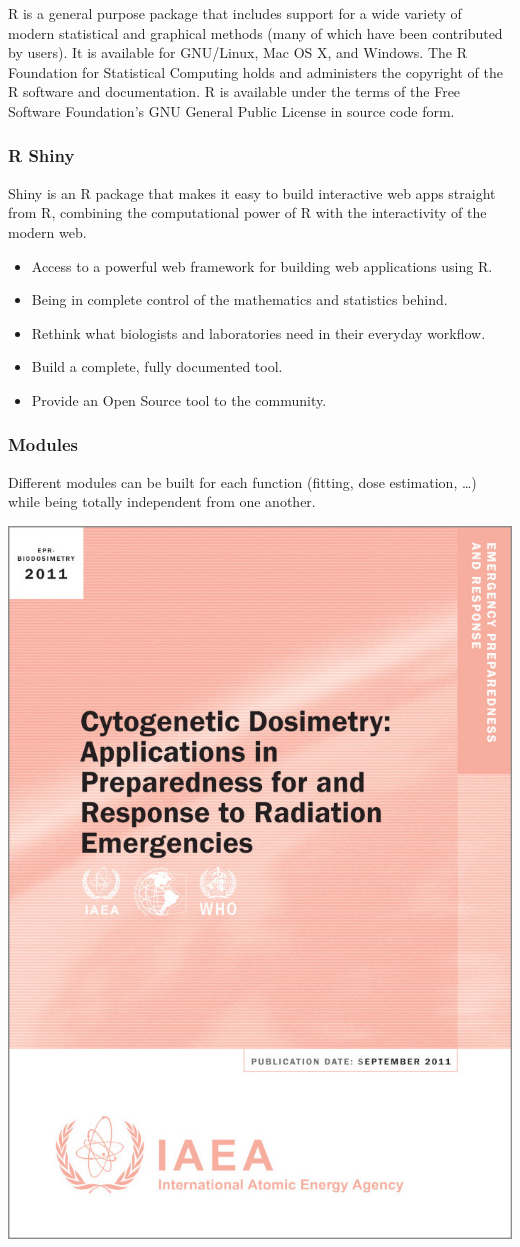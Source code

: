 \documentclass[]{scrartcl}
\begin{document}
R is a general purpose package that includes support for a wide variety of modern
statistical and graphical methods (many of which have been contributed by users). It is available for GNU/Linux, Mac OS X, and Windows. The R Foundation for Statistical Computing holds and administers the copyright of the R software and documentation. R is available under the terms of the Free Software Foundation's GNU General Public License in source code form.

\hypertarget{r-shiny-1}{%
\subsubsection{R Shiny}\label{r-shiny-1}}

Shiny is an R package that makes it easy to build interactive web apps straight from R, combining the computational power of R with the interactivity of the modern web.

\begin{itemize}
\item
  Access to a powerful web framework for building web applications using R.
\item
  Being in complete control of the mathematics and statistics behind.
\item
  Rethink what biologists and laboratories need in their everyday workflow.
\item
  Build a complete, fully documented tool.
\item
  Provide an Open Source tool to the community.
\end{itemize}

\hypertarget{intro-background-modules}{%
\subsubsection{Modules}\label{intro-background-modules}}

Different modules can be built for each function (fitting, dose estimation, \ldots) while being totally independent from one another.

\begin{center}\includegraphics[width=0.35\linewidth]{images/stats/iaea-cover} \end{center}
\end{document}
